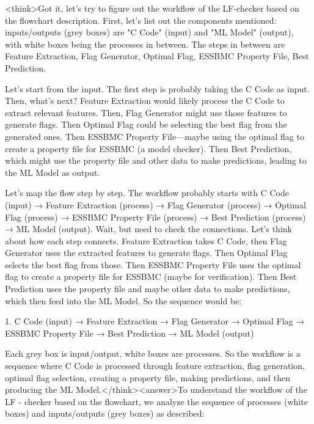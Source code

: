 <think>Got it, let's try to figure out the workflow of the LF-checker based on the flowchart description. First, let's list out the components mentioned: inputs/outputs (grey boxes) are "C Code" (input) and "ML Model" (output), with white boxes being the processes in between. The steps in between are Feature Extraction, Flag Generator, Optimal Flag, ESSBMC Property File, Best Prediction.

Let's start from the input. The first step is probably taking the C Code as input. Then, what's next? Feature Extraction would likely process the C Code to extract relevant features. Then, Flag Generator might use those features to generate flags. Then Optimal Flag could be selecting the best flag from the generated ones. Then ESSBMC Property File—maybe using the optimal flag to create a property file for ESSBMC (a model checker). Then Best Prediction, which might use the property file and other data to make predictions, leading to the ML Model as output.

Let's map the flow step by step. The workflow probably starts with C Code (input) → Feature Extraction (process) → Flag Generator (process) → Optimal Flag (process) → ESSBMC Property File (process) → Best Prediction (process) → ML Model (output). Wait, but need to check the connections. Let's think about how each step connects. Feature Extraction takes C Code, then Flag Generator uses the extracted features to generate flags. Then Optimal Flag selects the best flag from those. Then ESSBMC Property File uses the optimal flag to create a property file for ESSBMC (maybe for verification). Then Best Prediction uses the property file and maybe other data to make predictions, which then feed into the ML Model. So the sequence would be:

1. C Code (input) → Feature Extraction → Flag Generator → Optimal Flag → ESSBMC Property File → Best Prediction → ML Model (output)

Each grey box is input/output, white boxes are processes. So the workflow is a sequence where C Code is processed through feature extraction, flag generation, optimal flag selection, creating a property file, making predictions, and then producing the ML Model.</think><answer>To understand the workflow of the LF - checker based on the flowchart, we analyze the sequence of processes (white boxes) and inputs/outputs (grey boxes) as described:  

